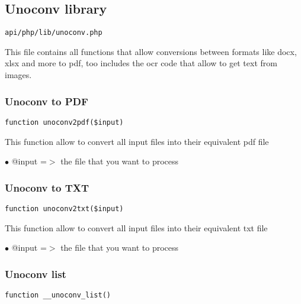 \documentclass[a4paper]{article}
\begin{document}
\hypertarget{toc531}{}
\subsection{Unoconv library}

\begin{lstlisting}
api/php/lib/unoconv.php
\end{lstlisting}

This file contains all functions that allow conversions between formats like
docx, xlsx and more to pdf, too includes the ocr code that allow to get text
from images.

\hypertarget{toc532}{}
\subsubsection{Unoconv to PDF}

\begin{lstlisting}
function unoconv2pdf($input)
\end{lstlisting}

This function allow to convert all input files into their equivalent pdf file

\begin{compactitem}
\item[\color{myblue}$\bullet$] @input =$>$ the file that you want to process
\end{compactitem}

\hypertarget{toc533}{}
\subsubsection{Unoconv to TXT}

\begin{lstlisting}
function unoconv2txt($input)
\end{lstlisting}

This function allow to convert all input files into their equivalent txt file

\begin{compactitem}
\item[\color{myblue}$\bullet$] @input =$>$ the file that you want to process
\end{compactitem}

\hypertarget{toc534}{}
\subsubsection{Unoconv list}

\begin{lstlisting}
function __unoconv_list()
\end{lstlisting}
\end{document}
